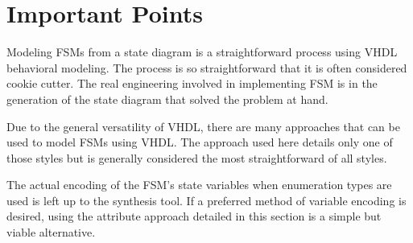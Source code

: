 \section{Important Points}

\begin{my_list}
\item Modeling FSMs from a state diagram is a straightforward process using VHDL behavioral modeling. The process is so straightforward that it is often considered cookie cutter. The real engineering involved in implementing FSM is in the generation of the state diagram that solved the problem at hand.

\item Due to the general versatility of VHDL, there are many approaches that can be used to model FSMs using VHDL. The approach used here details only one of those styles but is generally considered the most straightforward of all styles.

\item The actual encoding of the FSM's state variables when enumeration types are used is left up to the synthesis tool. If a preferred method of variable encoding is desired, using the attribute approach detailed in this section is a simple but viable alternative.
\end{my_list}

